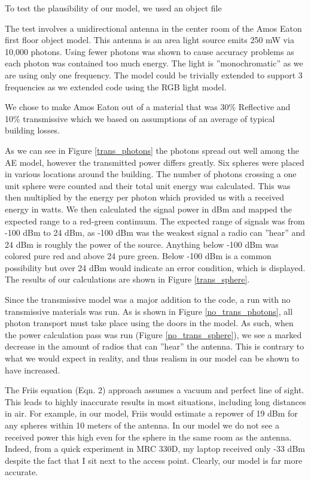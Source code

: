 \documentclass[%
        final,
        notitlepage,
        narroweqnarray,
        inline,
        twoside,
        ]{ieee}
\begin{document}
To test the plausibility of our model, we used an object file

The test involves a unidirectional antenna in the center room of the Amos Eaton
first floor object model. This antenna is an area light source emits 250 mW via 
10,000 photons. Using fewer photons was shown to cause accuracy problems as each
photon was contained too much energy. The light is ''monochromatic'' as we are 
using only one frequency. The model could be trivially extended to support 3 
frequencies as we extended code using the RGB light model.

We chose to make Amos Eaton out of a material that was 30\% Reflective and 10\%
transmissive which we based on assumptions of an average of typical building losses.

As we can see in Figure \ref{trans_photons} the photons spread out well among the AE model, however
the transmitted power differs greatly. Six spheres were placed in various locations around
the building. The number of photons crossing a one unit sphere were counted and their total 
unit energy was calculated. This was then multiplied by the energy per photon which provided
us with a received energy in watts. We then calculated the signal power in dBm and mapped the
expected range to a red-green continuum. The expected range of signals was from -100 dBm to 24 dBm,
as -100 dBm was the weakest signal a radio can ''hear'' and 24 dBm is roughly the power of the source.
Anything below -100 dBm was colored pure red and above 24 pure green. Below -100 dBm is a common 
possibility but over 24 dBm would indicate an error condition, which is displayed. The results of our
calculations are shown in Figure \ref{trans_sphere}.

Since the transmissive model was a major addition to the code, a run with no transmissive materials was
run. As is shown in Figure \ref{no_trans_photons}, all photon transport must take place using the doors
in the model. As such, when the power calculation pass was run (Figure \ref{no_trans_sphere}), we see a marked decrease in the amount of radios that can ''hear'' the antenna. This is contrary to what we would expect in reality, and thus
realism in our model can be shown to have increased.
  
The Friis equation (Eqn. 2) approach assumes a vacuum and perfect line of sight.
This leads to highly inaccurate results in most situations, including long
distances in air. For example, in our model, Friis would estimate a repower of 19 dBm 
for any spheres within 10 meters of the antenna. In our model we do not see a received power 
this high even for the sphere in the same room as the antenna. Indeed, from a quick experiment in
MRC 330D, my laptop received only -33 dBm despite the fact that I sit next to the access point.
Clearly, our model is far more accurate.  
\end{document}
